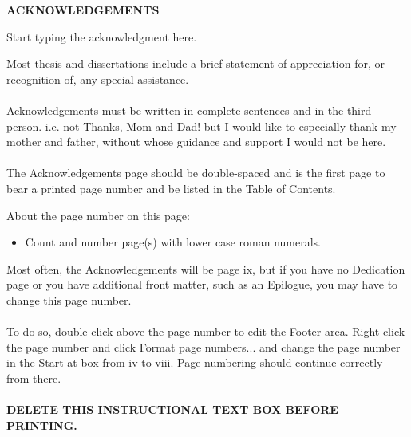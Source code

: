 \documentclass{article}
\begin{document}
\NoBgThispage
\newpage

\begin{center}
     \bf {ACKNOWLEDGEMENTS} 
\end{center}
Start typing the acknowledgment here. 

\begin{tcolorbox}[enhanced jigsaw,
    sharp corners,
    boxrule=0.5pt, 
    colback=blue!30!white,   
    borderline={0.5pt}{-2pt}{black,solid} %
 ]
 \begin{justify}
 Most thesis and dissertations include a brief statement of appreciation for, or recognition of, any special assistance.\\~\\
Acknowledgements must be written in complete sentences and in the third person. i.e. not  Thanks, Mom and Dad!  but  I would like to especially thank my mother and father, without whose guidance and support I would not be here. \\~\\
The Acknowledgements page should be double-spaced and is the first page to bear a printed page number and be listed in the Table of Contents.
\end{justify}
\end{tcolorbox}


\begin{tcolorbox}[enhanced jigsaw,
    sharp corners,
    boxrule=0.5pt, 
    colback=blue!30!white,   
    borderline={0.5pt}{-2pt}{black,solid} %
 ]
 \begin{justify}
 About the page number on this page:
\begin{itemize}
    \item Count and number page(s) with lower case roman numerals.
\end{itemize}
Most often, the Acknowledgements will be page ix, but if you have no Dedication page or you have additional front matter, such as an Epilogue, you may have to change this page number.
\\~\\
To do so, double-click above the page number to edit the Footer area.  Right-click the page number and click  Format page numbers...  and change the page number in the  Start at  box from iv to viii.  Page numbering should continue correctly from there.
\\~\\
{\bf DELETE THIS INSTRUCTIONAL TEXT BOX BEFORE PRINTING.}
\end{justify}
\end{tcolorbox}
\end{document}
